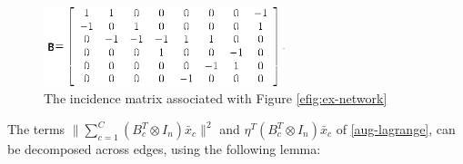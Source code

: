 \documentclass[conference]{IEEEtran}
\begin{document}
\begin{figure}[h]
\centering
\includegraphics[height = 3 cm, width = 7cm]{ex-incidencematrix1.png}
\caption{The incidence matrix associated with Figure \eqref{efig:ex-network}}
\label{fig:incidence-matrix}
\end{figure}

The terms \(\|\sum_{c=1}^C\left(B_c^T \otimes I_n\right)\bar{x}_c\|^2\) and \( \eta^T\left(B_c^T \otimes I_n\right)\bar{x}_c \) of \eqref{aug-lagrange}, can be decomposed across edges, using the following lemma:
\end{document}
